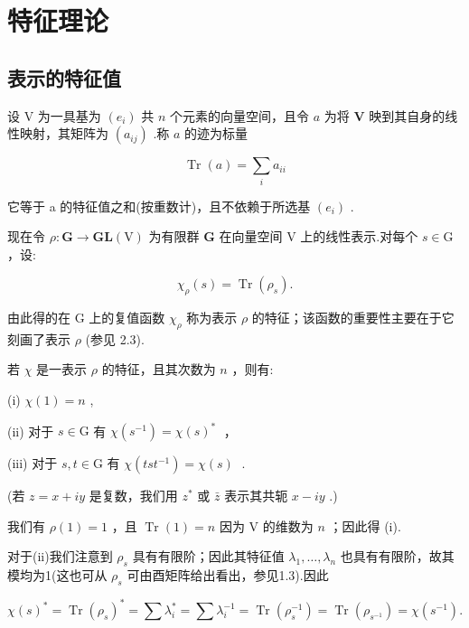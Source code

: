 \chapter{特征理论}

\section{表示的特征值}

设 \(\mathrm{V}\) 为一具基为 \(\left( {e}_{i}\right)\) 共 \(n\) 个元素的向量空间，且令 \(a\) 为将 \(\mathbf{V}\) 映到其自身的线性映射，其矩阵为 \(\left( {a}_{ij}\right)\) .称 \(a\) 的迹为标量

\[
\operatorname{Tr}\left( a\right)  = \mathop{\sum }\limits_{i}{a}_{ii}
\]

它等于 a 的特征值之和(按重数计)，且不依赖于所选基 \(\left( {e}_{i}\right)\) .

现在令 \(\rho  : \mathbf{G} \rightarrow  \mathbf{{GL}}\left( \mathrm{V}\right)\) 为有限群 \(\mathbf{G}\) 在向量空间 \(\mathrm{V}\) 上的线性表示.对每个 \(s \in  \mathrm{G}\) ，设:

\[
{\chi }_{\rho }\left( s\right)  = \operatorname{Tr}\left( {\rho }_{s}\right) .
\]

由此得的在 \(\mathrm{G}\) 上的复值函数 \({\chi }_{\rho }\) 称为表示 \(\rho\) 的特征；该函数的重要性主要在于它刻画了表示 \(\rho\) (参见 2.3).
\begin{proposition}[]
    若 \(\chi\) 是一表示 \(\rho\) 的特征，且其次数为 \(n\) ，则有:

(i) \(\chi \left( 1\right)  = n\) ,

(ii) 对于 \(s \in  \mathrm{G}\) 有 \(\chi \left( {s}^{-1}\right)  = \chi {\left( s\right) }^{ * }\;\) ，

(iii) 对于 \(s,t \in  \mathrm{G}\) 有 \(\chi \left( {{ts}{t}^{-1}}\right)  = \chi \left( s\right) \;\) .

(若 \(z = x + {iy}\) 是复数，我们用 \({z}^{ * }\) 或 \(\bar{z}\) 表示其共轭 \(x - {iy}\) .)
\end{proposition}

我们有 \(\rho \left( 1\right)  = 1\) ，且 \(\operatorname{Tr}\left( 1\right)  = n\) 因为 \(\mathrm{V}\) 的维数为 \(n\) ；因此得 (i).

对于(ii)我们注意到 \({\rho }_{s}\) 具有有限阶；因此其特征值 \({\lambda }_{1},\ldots ,{\lambda }_{n}\) 也具有有限阶，故其模均为1(这也可从 \({\rho }_{s}\) 可由酉矩阵给出看出，参见1.3).因此

\[
\chi {\left( s\right) }^{ * } = \operatorname{Tr}{\left( {\rho }_{s}\right) }^{ * } = \sum {\lambda }_{i}^{ * } = \sum {\lambda }_{i}^{-1} = \operatorname{Tr}\left( {\rho }_{s}^{-1}\right)  = \operatorname{Tr}\left( {\rho }_{{s}^{-1}}\right)  = \chi \left( {s}^{-1}\right) .
\]


